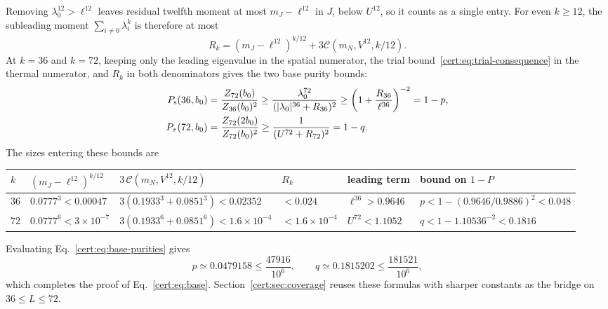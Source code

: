 Removing $\lambda_0^{12}>\ell^{12}$ leaves residual twelfth moment at
most $m_J-\ell^{12}$ in $J$, below $U^{12}$, so it counts as a
single entry. For even $k\ge12$, the subleading moment
$\sum_{i\ne0}\lambda_i^k$ is therefore at most
\begin{equation}
    R_k=(m_J-\ell^{12})^{k/12}
    +3\mathcal C(m_N,V^{12},k/12).
    \label{cert:eq:base-residual}
\end{equation}
At $k=36$ and $k=72$, keeping only the leading eigenvalue in the spatial
numerator, the trial bound~\eqref{cert:eq:trial-consequence} in the
thermal numerator, and $R_k$ in both denominators gives the two base
purity bounds:
\begin{align}
    P_{\mathrm s}(36,b_0) &=\frac{Z_{72}(b_0)}{Z_{36}(b_0)^2}
    \ge\frac{\lambda_0^{72}}{(|\lambda_0|^{36}+R_{36})^2}
    \ge\left(1+\frac{R_{36}}{\ell^{36}}\right)^{-2}=1-p,\notag\\
    P_{\tau}(72,b_0) &=\frac{Z_{72}(2b_0)}{Z_{72}(b_0)^2}
    \ge\frac{1}{(U^{72}+R_{72})^2}=1-q.
    \label{cert:eq:base-purities}
\end{align}
The sizes entering these bounds are
\begin{center}
    \footnotesize
    \setlength{\tabcolsep}{4pt}
    \begin{tabular}{@{}llllll@{}}
        \toprule
        $k$ & $(m_J-\ell^{12})^{k/12}$  & $3\,\mathcal C(m_N,V^{12},k/12)$        & $R_k$
            & leading term              & bound on $1-P$                                                      \\
        \midrule
        36  & $0.0777^3<0.00047$        & $3(0.1933^3+0.0851^3)<0.02352$          & $<0.024$
            & $\ell^{36}>0.9646$        & $p<1-(0.9646/0.9886)^2<0.048$                                       \\
        72  & $0.0777^6<3\times10^{-7}$ & $3(0.1933^6+0.0851^6)<1.6\times10^{-4}$
            & $<1.6\times10^{-4}$       & $U^{72}<1.1052$                         & $q<1-1.10536^{-2}<0.1816$ \\
        \bottomrule
    \end{tabular}
\end{center}

Evaluating Eq.~\eqref{cert:eq:base-purities} gives%
~
\begin{equation}
    p\simeq0.0479158\le\frac{47916}{10^6},\qquad
    q\simeq0.1815202\le\frac{181521}{10^6},
    \label{cert:eq:scalar-checks}
\end{equation}
which completes the proof of Eq.~\eqref{cert:eq:base}.
Section~\ref{cert:sec:coverage} reuses these formulas with sharper
constants as the bridge on $36\le L\le72$.

